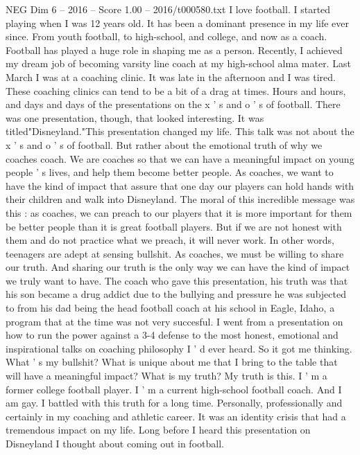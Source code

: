 \begin{textsample}{NEG Dim 6 – 2016 – Score 1.00 – 2016/t000580.txt}  \label{ex:f6_neg_034}
I love football.
I started playing when I was 12 years old.
It has been a dominant presence in my life ever since.
From youth football, to high-school, and college, and now as a coach.
Football has played a huge role in shaping me as a person.
Recently, I achieved my dream job of becoming varsity line coach at my high-school alma mater.
Last March I was at a coaching clinic.
It was late in the afternoon and I was tired.
These coaching clinics can tend to be a bit of a drag at times.
Hours and hours, and days and days of the presentations on the x ' s and o ' s of football.
There was one presentation, though, that looked interesting.
It was titled"Disneyland."This presentation changed my life.
This talk was not about the x ' s and o ' s of football.
But rather about the emotional truth of why we coaches coach.
We are coaches so that we can have a meaningful impact on young people ' s lives, and help them become better people.
As coaches, we want to have the kind of impact that assure that one day our players can hold hands with their children and walk into Disneyland.
The moral of this incredible message was this : as coaches, we can preach to our players that it is more important for them be better people than it is great football players.
But if we are not honest with them and do not practice what we preach, it will never work.
In other words, teenagers are adept at sensing bullshit.
As coaches, we must be willing to share our truth.
And sharing our truth is the only way we can have the kind of impact we truly want to have.
The coach who gave this presentation, his truth was that his son became a drug addict due to the bullying and pressure he was subjected to from his dad being the head football coach at his school in Eagle, Idaho, a program that at the time was not very succesful.
I went from a presentation on how to run the power against a 3-4 defense to the most honest, emotional and inspirational talks on coaching philosophy I ' d ever heard.
So it got me thinking.
What ' s my bullshit?
What is unique about me that I bring to the table that will have a meaningful impact?
What is my truth?
My truth is this.
I ' m a former college football player.
I ' m a current high-school football coach.
And I am gay.
I battled with this truth for a long time.
Personally, professionally and certainly in my coaching and athletic career.
It was an identity crisis that had a tremendous impact on my life.
Long before I heard this presentation on Disneyland I thought about coming out in football.

\end{textsample}
